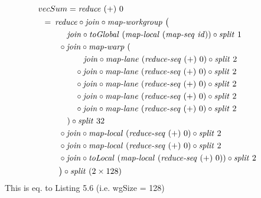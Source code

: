 \begin{align}
  &\hspace{-1.5em}vecSum = \reduce\ (+)\ 0\nonumber\\
  &\hspace{-2em}\quad\begin{aligned}
    &=\hspace{.2em}
      \reduce \circ \join \circ \mapWorkgroup\ \big(\\
      &\qquad\quad \join \circ \toGlobal\ (\mapLocal\ (\mapSeq\ \id)) \circ \splitN\ 1\\
      &\qquad \circ \join \circ \mapWarp\ (\\
      &\qquad\qquad\ \ \ \join \circ \mapLane\ (\reduceSeq\ (+)\ 0) \circ \splitN\ 2\\
      &\qquad\qquad \circ \join \circ \mapLane\ (\reduceSeq\ (+)\ 0) \circ \splitN\ 2\\
      &\qquad\qquad \circ \join \circ \mapLane\ (\reduceSeq\ (+)\ 0) \circ \splitN\ 2\\
      &\qquad\qquad \circ \join \circ \mapLane\ (\reduceSeq\ (+)\ 0) \circ \splitN\ 2\\
      &\qquad\qquad \circ \join \circ \mapLane\ (\reduceSeq\ (+)\ 0) \circ \splitN\ 2\\
      &\qquad\quad) \circ \splitN\ 32\\
      &\qquad \circ \join \circ \mapLocal\ (\reduceSeq\ (+)\ 0) \circ \splitN\ 2\\
      &\qquad \circ \join \circ \mapLocal\ (\reduceSeq\ (+)\ 0) \circ \splitN\ 2\\
      &\qquad \circ \join \circ \toLocal\ (\mapLocal\ (\reduceSeq\ (+)\ 0)) \circ \splitN\ 2\\
      &\qquad\big) \circ \splitN\ (2\times 128)
  \end{aligned}
\end{align}
This is eq. to Listing 5.6 (i.e. wgSize = 128)

